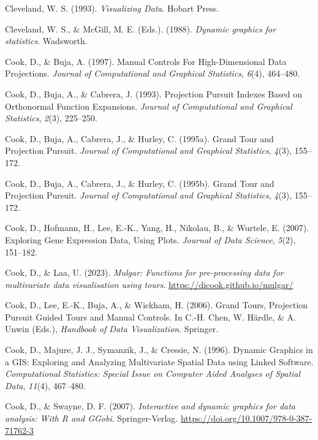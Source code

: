 \documentclass[
  letterpaper,
]{krantz}
\newlength{\cslhangindent}
\newenvironment{CSLReferences}[2] %
 {\begin{list}{}{%
  \setlength{\itemindent}{0pt}
  \setlength{\leftmargin}{0pt}
  \setlength{\parsep}{0pt}
  \ifodd #1
   \setlength{\leftmargin}{\cslhangindent}
   \setlength{\itemindent}{-1\cslhangindent}
  \fi
  \setlength{\itemsep}{#2\baselineskip}}}
 {\end{list}}
\begin{document}
\begin{CSLReferences}{1}{0}
Cleveland, W. S. (1993). \emph{Visualizing {D}ata}. Hobart Press.

Cleveland, W. S., \& McGill, M. E. (Eds.). (1988). \emph{Dynamic
graphics for statistics}. Wadsworth.

Cook, D., \& Buja, A. (1997). {M}anual {C}ontrols {F}or
{H}igh-{D}imensional {D}ata {P}rojections. \emph{Journal of
Computational and Graphical Statistics}, \emph{6}(4), 464--480.

Cook, D., Buja, A., \& Cabrera, J. (1993). {P}rojection {P}ursuit
{I}ndexes {B}ased on {O}rthonormal {F}unction {E}xpansions.
\emph{Journal of Computational and Graphical Statistics}, \emph{2}(3),
225--250.

Cook, D., Buja, A., Cabrera, J., \& Hurley, C. (1995a). Grand {T}our and
{P}rojection {P}ursuit. \emph{Journal of Computational and Graphical
Statistics}, \emph{4}(3), 155--172.

Cook, D., Buja, A., Cabrera, J., \& Hurley, C. (1995b). Grand {T}our and
{P}rojection {P}ursuit. \emph{Journal of Computational and Graphical
Statistics}, \emph{4}(3), 155--172.

Cook, D., Hofmann, H., Lee, E.-K., Yang, H., Nikolau, B., \& Wurtele, E.
(2007). Exploring {G}ene {E}xpression {D}ata, {U}sing {P}lots.
\emph{Journal of Data Science}, \emph{5}(2), 151--182.

Cook, D., \& Laa, U. (2023). \emph{Mulgar: Functions for pre-processing
data for multivariate data visualisation using tours}.
\url{https://dicook.github.io/mulgar/}

Cook, D., Lee, E.-K., Buja, A., \& Wickham, H. (2006). {G}rand {T}ours,
{P}rojection {P}ursuit {G}uided {T}ours and {M}anual {C}ontrols. In
C.-H. Chen, W. Härdle, \& A. Unwin (Eds.), \emph{Handbook of {D}ata
{V}isualization}. Springer.

Cook, D., Majure, J. J., Symanzik, J., \& Cressie, N. (1996). {D}ynamic
{G}raphics in a {GIS}: {E}xploring and {A}nalyzing {M}ultivariate
{S}patial {D}ata using {L}inked {S}oftware. \emph{Computational
Statistics: Special Issue on Computer Aided Analyses of Spatial Data},
\emph{11}(4), 467--480.

Cook, D., \& Swayne, D. F. (2007). \emph{Interactive and dynamic
graphics for data analysis: With {R} and {GGobi}}. Springer-Verlag.
\url{https://doi.org/10.1007/978-0-387-71762-3}


\end{CSLReferences}
\end{document}
